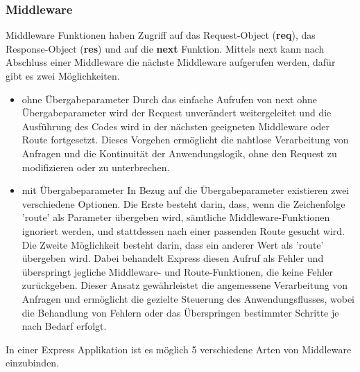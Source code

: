 \subsubsection{Middleware}
Middleware Funktionen haben Zugriff auf das Request-Object (\textbf{req}), das Response-Object (\textbf{res}) und auf die \textbf{next} Funktion. Mittels next kann nach Abschluss einer Middleware die nächste Middleware aufgerufen werden, dafür gibt es zwei Möglichkeiten.
\begin{itemize}
    \item ohne Übergabeparameter
        \newline
        Durch das einfache Aufrufen von next ohne Übergabeparameter wird der Request unverändert weitergeleitet und die Ausführung des Codes wird in der nächsten geeigneten Middleware oder Route fortgesetzt. Dieses Vorgehen ermöglicht die nahtlose Verarbeitung von Anfragen und die Kontinuität der Anwendungslogik, ohne den Request zu modifizieren oder zu unterbrechen.
    \item mit Übergabeparameter
        \newline
        In Bezug auf die Übergabeparameter existieren zwei verschiedene Optionen. Die Erste besteht darin, dass, wenn die Zeichenfolge 'route' als Parameter übergeben wird, sämtliche Middleware-Funktionen ignoriert werden, und stattdessen nach einer passenden Route gesucht wird. Die Zweite Möglichkeit besteht darin, dass ein anderer Wert als 'route' übergeben wird. Dabei behandelt Express diesen Aufruf als Fehler und überspringt jegliche Middleware- und Route-Funktionen, die keine Fehler zurückgeben. Dieser Ansatz gewährleistet die angemessene Verarbeitung von Anfragen und ermöglicht die gezielte Steuerung des Anwendungsflusses, wobei die Behandlung von Fehlern oder das Überspringen bestimmter Schritte je nach Bedarf erfolgt.
\end{itemize}
\newpage
In einer Express Applikation ist es möglich 5 verschiedene Arten von Middleware einzubinden.


